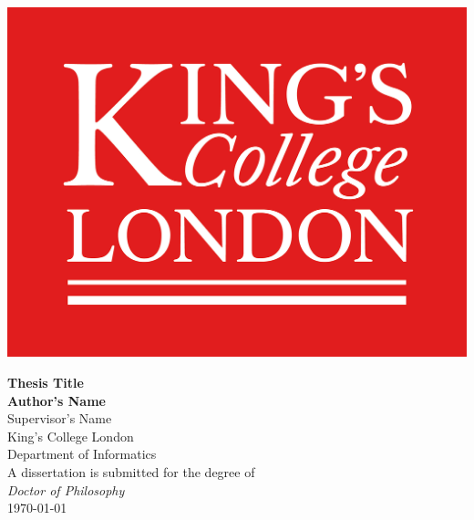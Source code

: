 \documentclass[12pt, a4paper]{report}
\begin{document}
\thispagestyle{empty}
\begin{center}
\begin{flushright}
\includegraphics[scale=0.4]{FrontMatter/logo.png}\\
\end{flushright}
\vspace*{2in}
\huge{\textbf{Thesis Title}}\\
\vspace*{0.4in}
\Large{\textbf{Author's Name}}\\
\Large{Supervisor's Name}\\
\vspace*{0.4in}
King's College London\\
Department of Informatics\\
\vspace*{0.4in}
A dissertation is submitted for the degree of\\
\textit{Doctor of Philosophy}\\
\vspace*{0.2in}
\today\\
\end{center}









\end{document}
